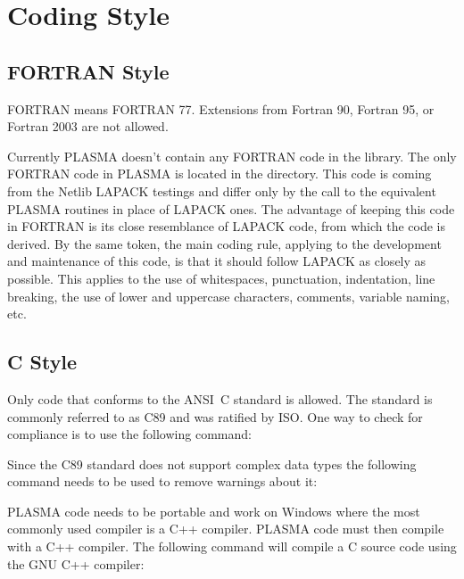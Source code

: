 
\chapter{Coding Style}


\section{FORTRAN Style}
FORTRAN means FORTRAN 77.
Extensions from Fortran 90, Fortran 95, or Fortran 2003 are not allowed.

Currently PLASMA doesn't contain any FORTRAN code in the library. The
only FORTRAN code in PLASMA is located in the
\mbox{} directory. This code is coming from the
Netlib LAPACK testings and differ only
by the call to the equivalent PLASMA routines in place of LAPACK ones.
The advantage of keeping this code in FORTRAN is its close resemblance of
LAPACK code, from which the code is derived.
By the same token, the main coding rule, applying to the development and maintenance
of this code, is that it should follow LAPACK as closely as possible.
This applies to the use of whitespaces, punctuation, indentation, line breaking,
the use of lower and uppercase characters, comments, variable naming, etc.


\section{C Style}

Only code that conforms to the ANSI~C standard is allowed. The standard
is commonly referred to as C89 and was ratified by ISO.
One way to check for compliance is to use the following command:
\begin{cmd_line}
\end{cmd_line}
Since the C89 standard does not support complex data types the
following command needs to be used to remove warnings about it:
\begin{cmd_line}
\end{cmd_line}
PLASMA code needs to be portable and work on Windows where the most commonly
used compiler is a C++ compiler. PLASMA code must then compile with a C++
compiler. The following command will compile a C source code using
the GNU C++ compiler:
\begin{cmd_line}
\end{cmd_line}

